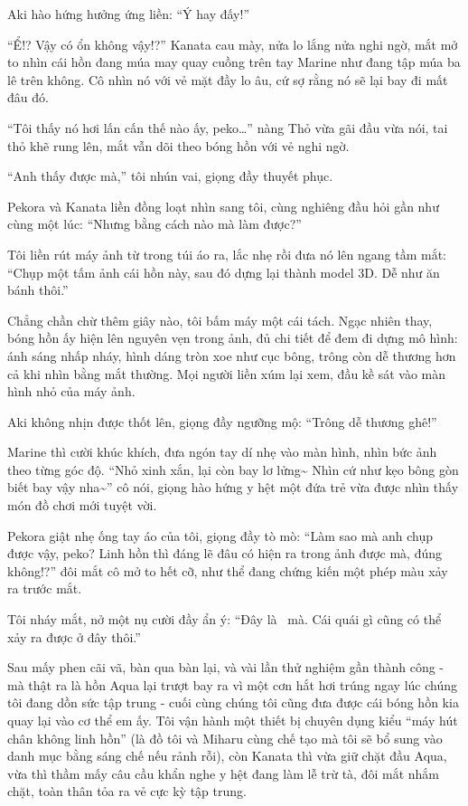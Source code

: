 \documentclass[../main.tex]{subfiles}
\begin{document}
Aki hào hứng hưởng ứng liền: ``Ý hay đấy!''

``Ể!? Vậy có ổn không vậy!?'' Kanata cau mày, nửa lo lắng nửa nghi ngờ, mắt mở to nhìn cái hồn đang múa may quay cuồng trên tay Marine như đang tập múa ba lê trên không. Cô nhìn nó với vẻ mặt đầy lo âu, cứ sợ rằng nó sẽ lại bay đi mất đâu đó.

``Tôi thấy nó hơi lấn cấn thế nào ấy, peko\dots'' nàng Thỏ vừa gãi đầu vừa nói, tai thỏ khẽ rung lên, mắt vẫn dõi theo bóng hồn với vẻ nghi ngờ.

``Anh thấy được mà,'' tôi nhún vai, giọng đầy thuyết phục.

Pekora và Kanata liền đồng loạt nhìn sang tôi, cùng nghiêng đầu hỏi gần như cùng một lúc: ``Nhưng bằng cách nào mà làm được?''

Tôi liền rút máy ảnh từ trong túi áo ra, lắc nhẹ rồi đưa nó lên ngang tầm mắt: ``Chụp một tấm ảnh cái hồn này, sau đó dựng lại thành model 3D. Dễ như ăn bánh thôi.''

Chẳng chần chừ thêm giây nào, tôi bấm máy một cái tách. Ngạc nhiên thay, bóng hồn ấy hiện lên nguyên vẹn trong ảnh, đủ chi tiết để đem đi dựng mô hình: ánh sáng nhấp nháy, hình dáng tròn xoe như cục bông, trông còn dễ thương hơn cả khi nhìn bằng mắt thường. Mọi người liền xúm lại xem, đầu kề sát vào màn hình nhỏ của máy ảnh.

Aki không nhịn được thốt lên, giọng đầy ngưỡng mộ: ``Trông dễ thương ghê!''

Marine thì cười khúc khích, đưa ngón tay dí nhẹ vào màn hình, nhìn bức ảnh theo từng góc độ. ``Nhỏ xinh xắn, lại còn bay lơ lửng\~{} Nhìn cứ như kẹo bông gòn biết bay vậy nha\~{}'' cô nói, giọng hào hứng y hệt một đứa trẻ vừa được nhìn thấy món đồ chơi mới tuyệt vời.

Pekora giật nhẹ ống tay áo của tôi, giọng đầy tò mò: ``Làm sao mà anh chụp được vậy, peko? Linh hồn thì đáng lẽ đâu có hiện ra trong ảnh được mà, đúng không!?'' đôi mắt cô mở to hết cỡ, như thể đang chứng kiến một phép màu xảy ra trước mắt.

Tôi nháy mắt, nở một nụ cười đầy ẩn ý: ``Đây là \hll\ mà. Cái quái gì cũng có thể xảy ra được ở đây thôi.''

\ct

Sau mấy phen cãi vã, bàn qua bàn lại, và vài lần thử nghiệm gần thành công - mà thật ra là hồn Aqua lại trượt bay ra vì một cơn hắt hơi trúng ngay lúc chúng tôi đang dồn sức tập trung - cuối cùng chúng tôi cũng đưa được cái bóng hồn kia quay lại vào cơ thể em ấy. Tôi vận hành một thiết bị chuyên dụng kiểu ``máy hút chân không linh hồn'' (là đồ tôi và Miharu cùng chế tạo mà tôi sẽ bổ sung vào danh mục bằng sáng chế nếu rảnh rỗi), còn Kanata thì vừa giữ chặt đầu Aqua, vừa thì thầm mấy câu cầu khẩn nghe y hệt đang làm lễ trừ tà, đôi mắt nhắm chặt, toàn thân tỏa ra vẻ cực kỳ tập trung.
\end{document}
